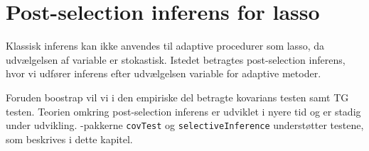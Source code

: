 \chapter{Post-selection inferens for lasso} \label{kap:statistisk_inferens}
Klassisk inferens kan ikke anvendes til adaptive procedurer som lasso, da udvælgelsen af variable er stokastisk.
Istedet betragtes post-selection inferens, hvor vi udfører inferens efter udvælgelsen variable for adaptive metoder.

Foruden boostrap vil vi i den empiriske del betragte kovarians testen samt TG testen.
Teorien omkring post-selection inferens er udviklet i nyere tid og er stadig under udvikling.
\Rlang-pakkerne \texttt{covTest} og \texttt{selectiveInference} understøtter testene, som beskrives i dette kapitel.






